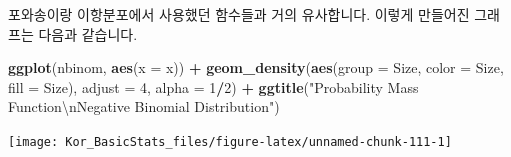 \documentclass[]{book}
\newenvironment{Shaded}{\begin{snugshade}}{\end{snugshade}}
\newcommand{\CharTok}[1]{\textcolor[rgb]{0.31,0.60,0.02}{#1}}
\newcommand{\DataTypeTok}[1]{\textcolor[rgb]{0.13,0.29,0.53}{#1}}
\newcommand{\DecValTok}[1]{\textcolor[rgb]{0.00,0.00,0.81}{#1}}
\newcommand{\FloatTok}[1]{\textcolor[rgb]{0.00,0.00,0.81}{#1}}
\newcommand{\KeywordTok}[1]{\textcolor[rgb]{0.13,0.29,0.53}{\textbf{#1}}}
\newcommand{\NormalTok}[1]{#1}
\newcommand{\OperatorTok}[1]{\textcolor[rgb]{0.81,0.36,0.00}{\textbf{#1}}}
\newcommand{\StringTok}[1]{\textcolor[rgb]{0.31,0.60,0.02}{#1}}
\begin{document}
\begin{Shaded}
\end{Shaded}

포와송이랑 이항분포에서 사용했던 함수들과 거의 유사합니다. 이렇게 만들어진 그래프는 다음과 같습니다.

\begin{Shaded}
\begin{Highlighting}[]
\KeywordTok{ggplot}\NormalTok{(nbinom, }\KeywordTok{aes}\NormalTok{(}\DataTypeTok{x =}\NormalTok{ x)) }\OperatorTok{+}
\StringTok{  }\KeywordTok{geom_density}\NormalTok{(}\KeywordTok{aes}\NormalTok{(}\DataTypeTok{group =}\NormalTok{ Size, }\DataTypeTok{color =}\NormalTok{ Size, }\DataTypeTok{fill =}\NormalTok{ Size), }
               \DataTypeTok{adjust =} \DecValTok{4}\NormalTok{, }\DataTypeTok{alpha =} \DecValTok{1}\OperatorTok{/}\DecValTok{2}\NormalTok{) }\OperatorTok{+}
\StringTok{  }\KeywordTok{ggtitle}\NormalTok{(}\StringTok{"Probability Mass Function}\CharTok{\textbackslash{}n}\StringTok{Negative Binomial Distribution"}\NormalTok{)}
\end{Highlighting}
\end{Shaded}

\begin{center}\texttt{[image: Kor\_BasicStats\_files/figure-latex/unnamed-chunk-111-1]} \end{center}
\end{document}
